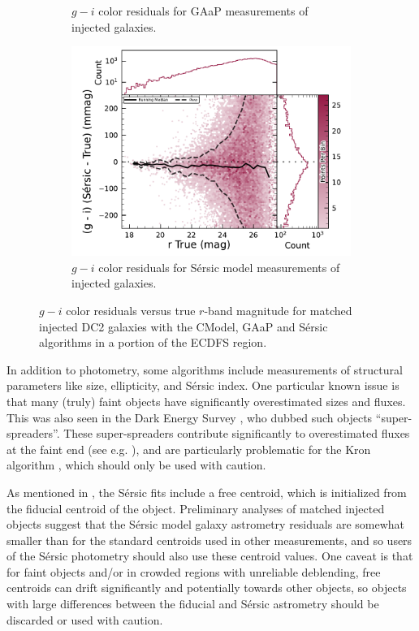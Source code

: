 \begin{figure}[hbt!]
\begin{subfigure}[t]{0.31\textwidth}
  \caption{$g-i$ color residuals for \gls{GAaP} measurements of injected galaxies.}
  \end{subfigure}\hfill
    \begin{subfigure}[t]{0.31\textwidth}
\includegraphics[width=\linewidth]{injected_lsst_cells_v1_5063_r_color_sersic_g_minus_i}
  \caption{$g-i$ color residuals for S\'ersic model measurements of injected galaxies.}
  \end{subfigure}\hfill
\caption{$g-i$ color residuals versus true $r$-band magnitude for matched injected DC2 galaxies with the CModel, \gls{GAaP} and S\'ersic algorithms in a portion of the \gls{ECDFS} region.}
\label{fig:injected_lsst_cells_v1_5063_r_color_g_minus_i}
\end{figure}
In addition to photometry, some algorithms include measurements of structural parameters like size, ellipticity, and S\'ersic index.
One particular known issue is that many (truly) faint objects have significantly overestimated sizes and fluxes.
This was also seen in the Dark Energy Survey \citep{2025arXiv250105739B}, who dubbed such objects ``super-spreaders''.
These super-spreaders contribute significantly to overestimated fluxes at the faint end (see e.g. ), and are particularly problematic for the Kron algorithm \citep{1980ApJS...43..305K}, which should only be used with caution.

As mentioned in , the S\'ersic fits include a free centroid, which is initialized from the fiducial centroid of the object.
Preliminary analyses of matched injected objects suggest that the S\'ersic model galaxy \gls{astrometry} residuals are somewhat smaller than for the standard centroids used in other measurements, and so users of the S\'ersic photometry should also use these centroid values.
One caveat is that for faint objects and/or in crowded regions with unreliable deblending, free centroids can drift significantly and potentially towards other objects, so objects with large differences between the fiducial and S\'ersic \gls{astrometry} should be discarded or used with caution.

